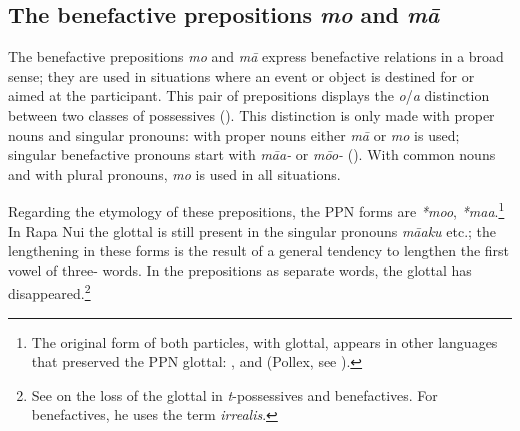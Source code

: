 \subsection{The benefactive prepositions \textit{mo} and \textit{mā}}\label{sec:4.7.7}
The benefactive prepositions \textit{mo} and \textit{mā} express benefactive relations in a broad sense; they are used in situations where an event or object is destined for or aimed at the participant. This pair of prepositions displays the \textit{o}/\textit{a} distinction between two classes of possessives (). This distinction is only made with proper nouns and singular pronouns: with proper nouns either \textit{mā} or \textit{mo} is used; singular benefactive pronouns start with \textit{mā{\ꞌ}a-} or \textit{mō{\ꞌ}o-} (). With common nouns and with plural pronouns, \textit{mo} is used in all situations. 

Regarding the etymology of these prepositions, the PPN forms are \textit{*mo{\ꞌ}o}, \mbox{\textit{*ma{\ꞌ}a}}.\footnote{\label{fn:233}The original form of both particles, with glottal, appears in other languages that preserved the PPN glottal: ,  and  (Pollex, see \citealt{GreenhillClark2011}).} In Rapa Nui the glottal is still present in the singular pronouns \textit{mā{\ꞌ}aku} etc.; the lengthening in these forms is the result of a general tendency to lengthen the first vowel of three- words. In the prepositions as separate words, the glottal has disappeared.\footnote{\label{fn:234}See \citet{Wilson1985} on the loss of the glottal in \textit{t}{}-possessives and benefactives. For benefactives, he uses the term \textit{irrealis}.}

